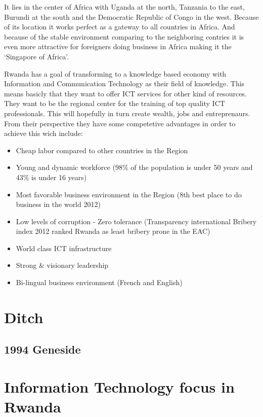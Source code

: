 It lies in the center of Africa with Uganda at the north, Tanzania to the east, Burundi at the south and the Democratic Republic of Congo in the west. Because of its location it works perfect as a gateway to all countries in Africa. 
And because of the stable environment comparing to the neighboring contries it is even more attractive for foreigners doing business in Africa making it the `Singapore of Africa'.

Rwanda has a goal of transforming to a knowledge based economy with Information and Communication Technology as their field of knowledge. This means basicly that they want to offer ICT services for other kind of resources. 
They want to be the regional center for the training of top quality ICT professionals.
This will hopefully in turn create wealth, jobs and entreprenaurs. From their perspective they have some competetive advantages in order to achieve this wich include:
\begin{itemize}
\item Cheap labor compared to other countries in the Region
\item Young and dynamic workforce (98\% of the population is under 50 years and 43\% is under 16 years)
\item Most favorable business environment in the Region (8th best place to do business in the world 2012)
\item Low levels of corruption - Zero tolerance (Transparency international Bribery index 2012 ranked Rwanda as least bribery prone in the EAC)
\item World class ICT infrastructure
\item Strong \& visionary leadership
\item Bi-lingual business environment (French and English)
\end{itemize}
\cite{2}

\section{Ditch}
\subsection{1994 Geneside}


\section{Information Technology focus in Rwanda}

